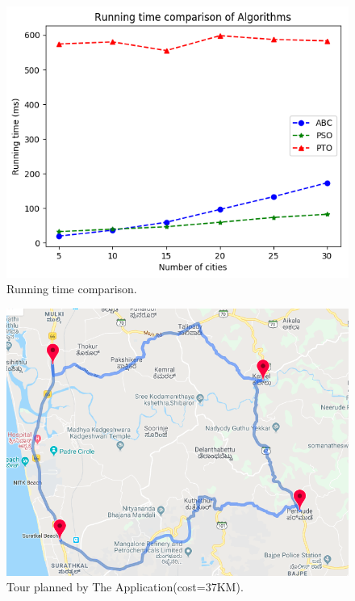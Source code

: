 \documentclass[conference]{IEEEtran}
\begin{document}
\begin{figure}[htbp]
\centerline{\includegraphics[width=\columnwidth]{runtime.png}}
\caption{Running time comparison.}
\label{fig2}
\end{figure}


\begin{figure}[htbp]
\centerline{\includegraphics[width=\columnwidth]{tspResultApp.png}}
\caption{Tour planned by The Application(cost=37KM).}
\label{fig3}
\end{figure}
\end{document}
